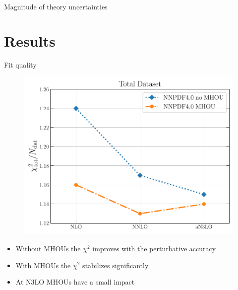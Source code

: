 \documentclass[aspectratio=169, 9pt,t]{beamer}
\begin{document}
\begin{frame}{Magnitude of theory uncertainties}
\end{frame}

\section{Results}

\begin{frame}{Fit quality}
  \begin{figure}[!t]
    \includegraphics[width=.4\textwidth]{figures/chi2_n3lo_summary.pdf}
  \end{figure}
  \begin{itemize}
    \item Without MHOUs the $\chi^2$ improves with the perturbative accuracy
    \item With MHOUs the $\chi^2$ stabilizes significantly
    \item At N3LO MHOUs have a small impact
  \end{itemize}
\end{frame}
\end{document}
